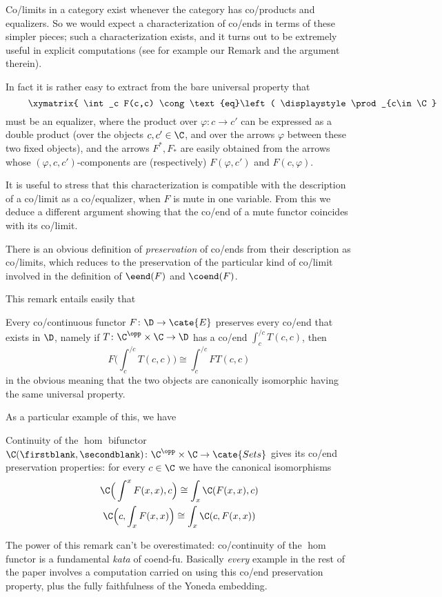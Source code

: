 \begin{remark}\label{endsareeq}
Co/limits in a category exist whenever the category has co/products and equalizers. So we would expect a  characterization of co/ends in terms of these simpler pieces; such a characterization exists, and it turns out to be extremely useful in explicit computations (see for example our Remark  and the argument therein). 

In fact it is rather easy to extract from the bare universal property that
\[
\vcenter{\xymatrix{
\int_c F(c,c) \cong \text{eq}\left( \displaystyle \prod_{c\in\C} F(c,c) \ar@<3pt>[r]^(.6){F^*}\ar@<-3pt>[r]_(.6){F_*}\right.& \left.\displaystyle \prod_{\varphi\colon c\to c'} F(c,c')\right)
}}
\]
must be an equalizer, where the product over ${\varphi\colon c\to c'}$ can be expressed as a double product (over the objects $c,c'\in \C$, and over the arrows $\varphi$ between these two fixed objects), and the arrows $F^*, F_*$ are easily obtained from the arrows whose $(\varphi, c,c')$\hyp{}components are (respectively) $F(\varphi, c')$ and $F(c, \varphi)$.
\end{remark}
It is useful to stress that this characterization is compatible with the description of a co/limit as a co/equalizer, when $F$ is mute in one variable. From this we deduce a different argument showing that the co/end of a mute functor coincides with its co/limit.
\begin{definition}
There is an obvious definition of \emph{preservation} of co/ends from their description as co/limits, which reduces to the preservation of the particular kind of co/limit involved in the definition of $\eend(F)$ and $\coend(F)$.
\end{definition}
This remark entails easily that 
\begin{theorem}\label{coconti}
Every co/continuous functor $F\colon \D\to\cate{E}$ preserves every co/end that exists in $\D$, namely if $T\colon \C^\opp\times\C\to \D$ has a co/end $\int_c^{/c} T(c,c)$, then 
\[
F\Big(\textstyle \int_c^{/c} T(c,c) \Big) \cong \int_c^{/c} FT(c,c)
\]
in the obvious meaning that the two objects are canonically isomorphic having the same universal property.
\end{theorem}
As a particular example of this, we have
\begin{corollary}\label{commuhom}
Continuity of the $\hom$ bifunctor $\C(\firstblank,\secondblank)\colon \C^\opp\times\C\to\cate{Sets}$ gives its co/end preservation properties: for every $c\in \C$ we have the canonical isomorphisms
\begin{gather*}
\C\Big( \int^x F(x,x),c \Big)  \cong \int_x \C(F(x,x),c)\\
\C\Big(c, \int_x F(x,x)\Big)\cong \int_x\C(c,F(x,x))
\end{gather*}
\end{corollary}
\begin{remark}
The power of this remark can't be overestimated: co/continuity of the $\hom$ functor is a fundamental \emph{kata} of coend\hyp{}fu. Basically \emph{every} example in the rest of the paper involves a computation carried on using this co/end preservation property, plus the fully faithfulness of the Yoneda embedding.
\end{remark}

